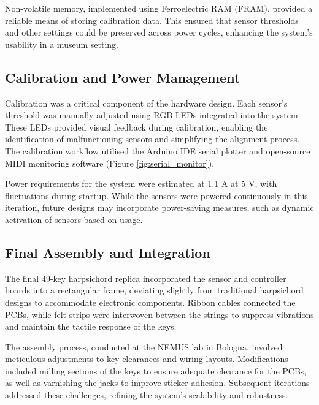 Non-volatile memory, implemented using Ferroelectric RAM (FRAM), provided a reliable means of storing calibration data. This ensured that sensor thresholds and other settings could be preserved across power cycles, enhancing the system's usability in a museum setting.

\subsection{Calibration and Power Management}\label{calibration}

Calibration was a critical component of the hardware design. Each sensor's threshold was manually adjusted using RGB LEDs integrated into the system. These LEDs provided visual feedback during calibration, enabling the identification of malfunctioning sensors and simplifying the alignment process. The calibration workflow utilised the Arduino IDE serial plotter and open-source MIDI monitoring software (Figure \ref{fig:serial_monitor}).

Power requirements for the system were estimated at 1.1 A at 5 V, with fluctuations during startup. While the sensors were powered continuously in this iteration, future designs may incorporate power-saving measures, such as dynamic activation of sensors based on usage.

\subsection{Final Assembly and Integration}

The final 49-key harpsichord replica incorporated the sensor and controller boards into a rectangular frame, deviating slightly from traditional harpsichord designs to accommodate electronic components. Ribbon cables connected the PCBs, while felt strips were interwoven between the strings to suppress vibrations and maintain the tactile response of the keys.

The assembly process, conducted at the NEMUS lab in Bologna, involved meticulous adjustments to key clearances and wiring layouts. Modifications included milling sections of the keys to ensure adequate clearance for the PCBs, as well as varnishing the jacks to improve sticker adhesion. Subsequent iterations addressed these challenges, refining the system’s scalability and robustness.


